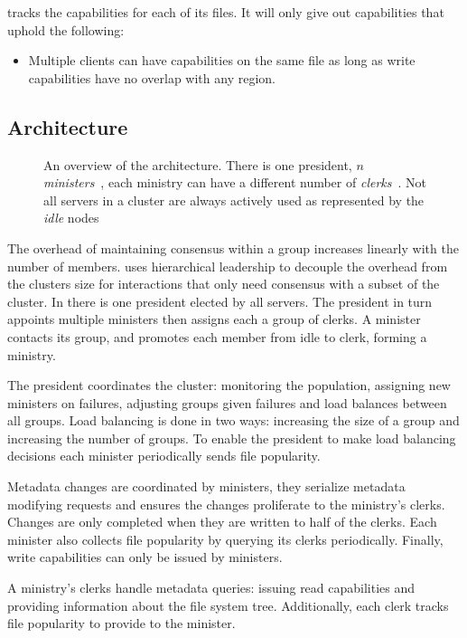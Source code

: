 \begin{samepage}
\Name{} tracks the capabilities for each of its files. It will only give out capabilities that uphold the following:
%
\begin{itemize}
	\item Multiple clients can have capabilities on the same file as long as write capabilities have no overlap with any region.
\end{itemize}
\end{samepage}
% 
\subsection{Architecture} \label{sec:arch}
\begin{figure}
	
	\caption{An overview of the architecture. There is one president, $n$ \emph{ministers}~\amdsLeg{}, each ministry can have a different number of \emph{clerks}~\cmdsLeg{}. Not all servers in a cluster are always actively used as represented by the \emph{idle} nodes~\umdsLeg{}}
\end{figure}

The overhead of maintaining consensus within a group increases linearly with the number of members. \Name{} uses hierarchical leadership to decouple the overhead from the clusters size for interactions that only need consensus with a subset of the cluster. In \Name{} there is one president elected by all servers. The president in turn appoints multiple ministers then assigns each a group of clerks. A minister contacts its group, and promotes each member from idle to clerk, forming a ministry. 

The president coordinates the cluster: monitoring the population, assigning new ministers on failures, adjusting groups given failures and load balances between all groups. Load balancing is done in two ways: increasing the size of a group and increasing the number of groups. To enable the president to make load balancing decisions each minister periodically sends file popularity.

Metadata changes are coordinated by ministers, they serialize metadata modifying requests and ensures the changes proliferate to the ministry's clerks. Changes are only completed when they are written to half of the clerks. Each minister also collects file popularity by querying its clerks periodically. Finally, write capabilities can only be issued by ministers.

A ministry's clerks handle metadata queries: issuing read capabilities and providing information about the file system tree. Additionally, each clerk tracks file popularity to provide to the minister. 

